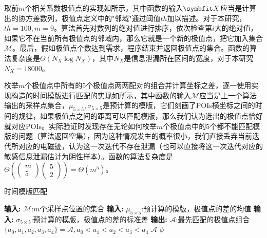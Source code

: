 {	取前$m$个相关系数极值点的实现如所示，其中函数的输入$\Vector X$应当是计算出的协方差数列，极值点定义中的"邻域"通过阈值$th$加以描述。对于本研究，$th=100,m=9$。算法首先对数列的绝对值进行排序，依次检查第$i$大的绝对值，如果它不在当前所有极值点的邻域内，那么它就是一个新的极值点，把它加入集合$\mathcal M$。最后，假如极值点个数达到需求，程序结束并返回极值点的集合。函数的算法复杂度是$\Theta(N_X\log N_X)$，其中$N_X$是信息泄漏所在区间的宽度，对于本研究$N_X=18000$。
	
	枚举$m$个极值点中所有的5个极值点两两配对的组合并计算坐标之差，逐一使用实现构造的时间模版进行匹配的实现如所示，其中函数的输入$\mathcal M$应当是上一个算法输出的采样点集合，$\mu_{5\times5},\sigma_{5\times5}$是预计算的模版，它们刻画了POIs横坐标之间的时间的规律，如果极值点之间的距离可以匹配模版，那么我们认为选出的极值点恰好就对应POIs。实际验证时发现存在无论如何枚举$m$个极值点中的5个都不能匹配模版的问题（算法返回空集），因为这种情况发生的概率很小，我们直接丢弃当前迭代所对应的电磁迹，认为这一次迭代不存在泄漏（也可以直接将这一次迭代对应的敏感信息泄漏估计为阴性样本）。函数的算法复杂度是$\Theta\left( \begin{pmatrix}m\\5\end{pmatrix}\begin{pmatrix}5\\2\end{pmatrix}\right) =\Theta(m^5)$。
	
	\begin{breakablealgorithm}
		\caption{时间模版匹配}\label{alg:checkdelta}
		\begin{algorithmic}[1]
			\Statex \textbf{输入:} $\mathcal M$:$m$个采样点位置的集合
			\Statex \textbf{输入:} $\mu_{5\times5}$:预计算的模版，极值点的差的均值
			\Statex \textbf{输入:} $\sigma_{5\times5}$:预计算的模版，极值点的差的标准差
			\Statex \textbf{输出:} $\mathcal A$:最先匹配的极值点组合
			\State $\{a_0,a_1,a_2,a_3,a_4\}=\mathcal A,a_0<a_1<a_2<a_3<a_4$
			\State \Return $\mathcal A$
			\EndIf
			\EndIf
			\EndFor
			\State \Return $\phi$
		\end{algorithmic}
	\end{breakablealgorithm}
	
}

